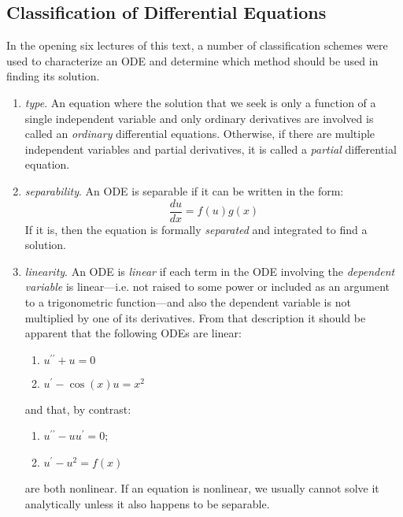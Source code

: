 \subsection{Classification of Differential Equations}

In the opening six lectures of this text, a number of classification schemes were used to characterize an ODE and determine which method should be used in finding its solution.


\begin{enumerate}

\item \emph{type}. An equation where the solution that we seek is only a function of a single independent variable and only ordinary derivatives are involved is called an \emph{ordinary} differential equations.  Otherwise, if there are multiple independent variables and partial derivatives, it is called a \emph{partial} differential equation.

\item \emph{separability}. An ODE is separable if it can be written in the form: 
\begin{equation*}
\frac{du}{dx} = f(u)g(x)
\end{equation*}
If it is, then the equation is formally \emph{separated} and integrated to find a solution.  
\item \emph{linearity}.  An ODE is \emph{linear} if each term in the ODE involving the \emph{dependent variable} is linear---i.e. not raised to some power or included as an argument to a trigonometric function---and also the dependent variable is not multiplied by one of its derivatives.  From that description it should be apparent that the following ODEs are linear:
\begin{enumerate}
\item $u^{\prime \prime} + u = 0$
\item $u^{\prime} - \cos{(x)} u = x^2$
\end{enumerate}
and that, by contrast:
\begin{enumerate}
\item $u^{\prime \prime} - u u^{\prime} = 0$; 
\item $u^{\prime} - u^2 = f(x)$
\end{enumerate}
are both nonlinear.  If an equation is nonlinear, we usually cannot solve it analytically unless it also happens to be separable.  


\end{enumerate}
